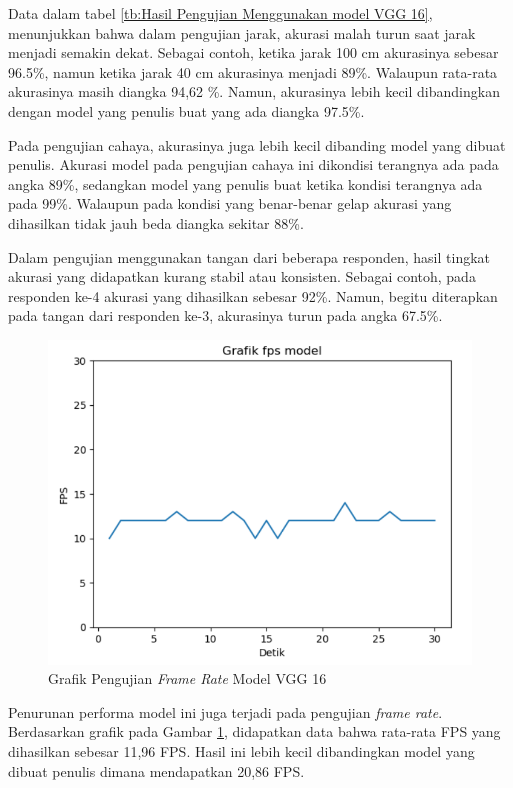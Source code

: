 Data dalam tabel \ref{tb:Hasil Pengujian Menggunakan model VGG 16}, menunjukkan bahwa dalam pengujian jarak, akurasi malah turun saat jarak menjadi semakin dekat. Sebagai contoh, ketika jarak 100 cm akurasinya sebesar 96.5\%, namun ketika jarak 40 cm akurasinya menjadi 89\%. Walaupun rata-rata akurasinya masih diangka 94,62 \%. Namun, akurasinya lebih kecil dibandingkan dengan model yang penulis buat yang ada diangka 97.5\%.

Pada pengujian cahaya, akurasinya juga lebih kecil dibanding model yang dibuat penulis. Akurasi model pada pengujian cahaya ini dikondisi terangnya ada pada angka 89\%, sedangkan model yang penulis buat ketika kondisi terangnya ada pada 99\%. Walaupun pada kondisi yang benar-benar gelap akurasi yang dihasilkan tidak jauh beda diangka sekitar 88\%.

Dalam pengujian menggunakan tangan dari beberapa responden, hasil tingkat akurasi yang didapatkan kurang stabil atau konsisten. Sebagai contoh, pada responden ke-4 akurasi yang dihasilkan sebesar 92\%. Namun, begitu diterapkan pada tangan dari responden ke-3, akurasinya turun pada angka 67.5\%.

\begin{figure}[!htb]
  \centering
  \includegraphics[scale=0.8]{gambar/pengujian-fps/grafik-pengujian-fps-vgg16.png}
  \caption{Grafik Pengujian \emph{Frame Rate} Model VGG 16}
  \label{fig:Grafik Pengujian Frame Rate Model VGG 16}
\end{figure}

Penurunan performa model ini juga terjadi pada pengujian \emph{frame rate}. Berdasarkan grafik pada Gambar \ref{fig:Grafik Pengujian Frame Rate Model VGG 16}, didapatkan data bahwa rata-rata FPS yang dihasilkan sebesar 11,96 FPS. Hasil ini lebih kecil dibandingkan model yang dibuat penulis dimana mendapatkan 20,86 FPS.

